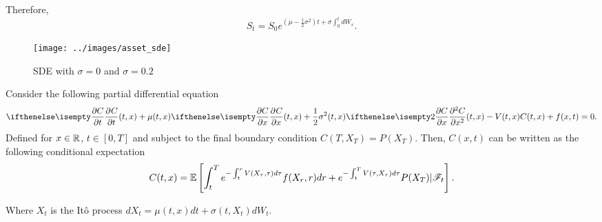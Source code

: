 \documentclass[../TGMAFFIRO.tex]{subfiles}
\begin{document}
Therefore,
\begin{equation}
  S_t = S_0e^{\left(\mu - \frac{1}{2}\sigma^2\right) t + \sigma\int_0^t dW_s}.
\end{equation}

\begin{figure}[h!]
\centering
  \texttt{[image: ../images/asset\_sde]}
  \caption{SDE with $\sigma=0$ and $\sigma=0.2$}
\end{figure}


\begin{theorem}
	Consider the following partial differential equation
	\begin{equation}
		\partialwrt{C}{t}{(t,x)}	 + \mu(t, x)\partialwrt{C}{x}{(t,x)} + \frac{1}{2}\sigma^2(t,x)\partialwrt[2]{C}{x}{(t,x)}  - V(t,x)C(t,x) + f(x,t) = 0 \label{eq:feynman_kac_pde}.
	\end{equation}
	Defined for $x\in\mathbb{R}$, $t\in[0,T]$ and subject to the final boundary condition $C(T, X_T) = P(X_T)$. Then, $C(x,t)$ can be written as the following conditional expectation
	\begin{equation}
	C(t, x) = \mathbb{E}\left[\int_t^Te^{-\int_t^r V(X_\tau, \tau) d\tau} f(X_r, r) dr + e^{-\int_t^TV(\tau, X_\tau) d\tau} P(X_T)| \mathscr{F}_t\right].
	\end{equation}

Where $X_t$ is the It\^o process $dX_t = \mu(t,x) dt + \sigma(t, X_t) dW_t$.
\end{theorem}
\end{document}
